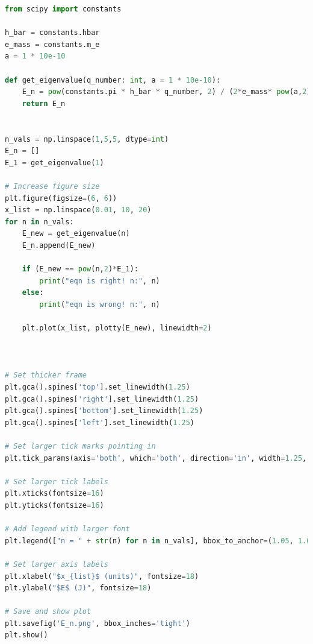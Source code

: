 \documentclass[a4paper,12pt]{article}
\begin{document}
\begin{lstlisting}[language=Python, caption= Code used to obtain E_n values]
    from scipy import constants

h_bar = constants.hbar
e_mass = constants.m_e
a = 1 * 10e-10

def get_eigenvalue(q_number: int, a = 1 * 10e-10):
    E_n = pow(constants.pi * h_bar * q_number, 2) / (2*e_mass* pow(a,2)) 
    return E_n


n_vals = np.linspace(1,5,5, dtype=int)
E_n = []
E_1 = get_eigenvalue(1)

# Increase figure size
plt.figure(figsize=(6, 6))
x_list = np.linspace(0.01, 10, 20)
for n in n_vals:
    E_new = get_eigenvalue(n)
    E_n.append(E_new)
    
    if (E_new == pow(n,2)*E_1):
        print("eqn is right! n:", n)
    else:
        print("eqn is wrong! n:", n)

    plt.plot(x_list, plotty(E_new), linewidth=2)



# Set thicker frame
plt.gca().spines['top'].set_linewidth(1.25)
plt.gca().spines['right'].set_linewidth(1.25)
plt.gca().spines['bottom'].set_linewidth(1.25)
plt.gca().spines['left'].set_linewidth(1.25)

# Set larger tick marks pointing in
plt.tick_params(axis='both', which='both', direction='in', width=1.25, size = 6)

# Set larger tick labels
plt.xticks(fontsize=16)
plt.yticks(fontsize=16)

# Add legend with larger font
plt.legend(["n = " + str(n) for n in n_vals], bbox_to_anchor=(1.05, 1.0), loc='upper left', fontsize=16)

# Set larger axis labels
plt.xlabel("$x_{list}$ (units)", fontsize=18)
plt.ylabel("$E$ (J)", fontsize=18)

# Save and show plot
plt.savefig('E_n.png', bbox_inches='tight')
plt.show()
\end{lstlisting}
\end{document}

